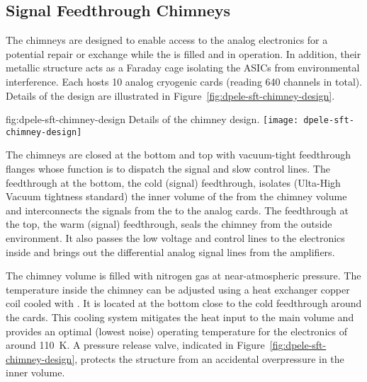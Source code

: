 \subsection{Signal Feedthrough Chimneys}
\label{sec:fddp-tpc-elec-design-sft}

The  chimneys are designed to enable access to the  analog electronics for a potential repair or exchange while the  is filled and in operation. %
In addition, their metallic structure acts as a Faraday cage isolating the  ASICs from environmental interference.  Each  hosts \num{10} analog cryogenic  cards (reading \num{640} channels in total).  %
Details of the design are illustrated in Figure~\ref{fig:dpele-sft-chimney-design}. 

\begin{dunefigure}{fig:dpele-sft-chimney-design}
{Details of the  chimney design.}
\texttt{[image: dpele-sft-chimney-design]}
\end{dunefigure}

The chimneys are closed at the bottom and top with vacuum-tight feedthrough flanges whose function is to dispatch the signal and slow control lines. The feedthrough at the bottom, the cold (signal) feedthrough, isolates (Ulta-High Vacuum tightness standard) the inner volume of the  from the chimney volume and interconnects the signals from the  to the analog  cards. The feedthrough at the top, the warm (signal) feedthrough, seals the chimney from the outside environment. It also passes the low voltage and control lines to the  electronics inside and brings out the differential analog signal lines from the  amplifiers. 

The  chimney volume is filled with nitrogen gas at near-atmospheric pressure. The temperature inside the chimney can be adjusted using a heat exchanger copper coil cooled with \lar. It is located at the bottom close to the cold feedthrough around the  cards. %
This cooling system %
mitigates the heat input to the main  volume and provides an optimal (lowest noise) operating temperature for the  electronics of around \SI{110}{K}. A pressure release valve, indicated in Figure~\ref{fig:dpele-sft-chimney-design}, protects the structure from an accidental overpressure in the inner volume. 

